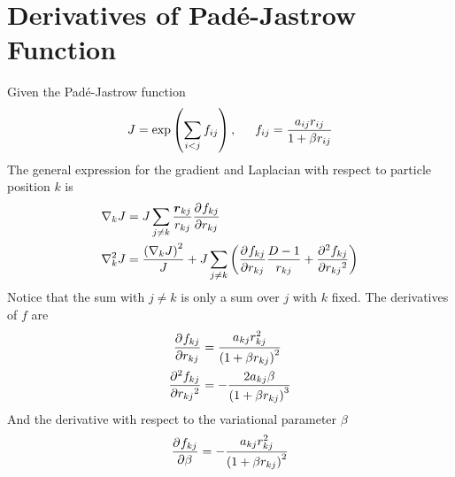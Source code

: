 \section{Derivatives of Pad\'e-Jastrow Function}
    Given the Pad\'e-Jastrow function
        \begin{equation}
            J = \exp\left(\sum\limits_{i<j}f_{ij}\right) ,\indent f_{ij} =
            \frac{a_{ij}r_{ij}}{1 + \beta r_{ij}}
        \end{equation}
    The general expression for the gradient and Laplacian with respect to
    particle position $k$ is
        \begin{equation}
            \begin{aligned}
                \nabla_k J &= J\sum_{j\neq k} \frac{\blds{r}_{kj}}{r_{kj}}
                \prd{r_{kj}}[f_{kj}] \\
                \nabla^2_k J &= \frac{\left(\nabla_k J\right)^2}{J} +
                J\sum_{j\neq k} \left(\prd{r_{kj}}[f_{kj}] \frac{D-1}{r_{kj}} +
                \prd{r_{kj}}[f_{kj}][2]\right)
            \end{aligned}
        \end{equation}
    Notice that the sum with $j\neq k$ is only a sum over $j$ with $k$ fixed.
    The derivatives of $f$ are
        \begin{equation}
            \begin{aligned}
                \prd{r_{kj}}[f_{kj}] &= \frac{a_{kj}r^2_{kj}}{\left(1 + \beta
                r_{kj}\right)^2} \\
                \prd{r_{kj}}[f_{kj}][2] &= -\frac{2a_{kj}\beta}{\left(1 + \beta
                r_{kj}\right)^3}
            \end{aligned}
        \end{equation}
    And the derivative with respect to the variational parameter $\beta$
        \begin{equation}
            \prd{\beta}[f_{kj}] = -\frac{a_{kj}r^2_{kj}}{\left(1 + \beta
            r_{kj}\right)^2}
        \end{equation}

